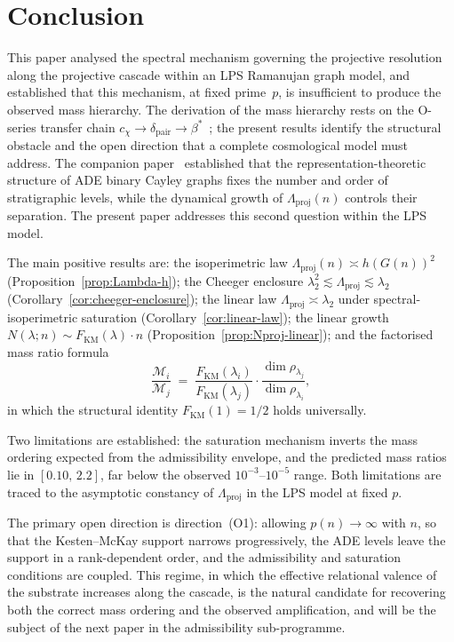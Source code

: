 \section{Conclusion}
  \label{sec:conclusion}

  This paper analysed the spectral mechanism governing the projective resolution
  along the projective cascade within an LPS Ramanujan graph model, and established
  that this mechanism, at fixed prime~$p$, is insufficient to produce the observed
  mass hierarchy.
  The derivation of the mass hierarchy rests on the O-series transfer chain
  $c_\chi \to \delta_{\mathrm{pair}} \to \beta^*$~\cite{Beau2026a28,Beau2026a29};
  the present results identify the structural obstacle and the open direction that a
  complete cosmological model must address.
  The companion paper~\cite{Beau2026a4} established that the
  representation-theoretic structure of ADE binary Cayley graphs fixes the
  number and order of stratigraphic levels, while the dynamical growth of
  $\Lambda_{\mathrm{proj}}(n)$ controls their separation.
  The present paper addresses this second question within the LPS model.

  The main positive results are: the isoperimetric law
  $\Lambda_{\mathrm{proj}}(n) \asymp h(G(n))^2$
  (Proposition~\ref{prop:Lambda-h}); the Cheeger enclosure
  $\lambda_2^2 \lesssim \Lambda_{\mathrm{proj}} \lesssim \lambda_2$
  (Corollary~\ref{cor:cheeger-enclosure}); the linear law
  $\Lambda_{\mathrm{proj}} \asymp \lambda_2$ under spectral-isoperimetric
  saturation (Corollary~\ref{cor:linear-law}); the linear growth
  $N(\lambda; n) \sim F_{\mathrm{KM}}(\lambda) \cdot n$
  (Proposition~\ref{prop:Nproj-linear}); and the factorised mass ratio formula
  \[
    \frac{\mathcal{M}_i}{\mathcal{M}_j}
    \;=\;
    \frac{F_{\mathrm{KM}}(\lambda_i)}{F_{\mathrm{KM}}(\lambda_j)}
    \cdot
    \frac{\dim\rho_{\lambda_j}}{\dim\rho_{\lambda_i}},
  \]
  in which the structural identity $F_{\mathrm{KM}}(1) = 1/2$ holds universally.

  Two limitations are established: the saturation mechanism inverts the mass
  ordering expected from the admissibility envelope, and the predicted mass
  ratios lie in $[0.10,\, 2.2]$, far below the observed $10^{-3}$--$10^{-5}$
  range.
  Both limitations are traced to the asymptotic constancy of
  $\Lambda_{\mathrm{proj}}$ in the LPS model at fixed $p$.

  The primary open direction is direction~(O1): allowing $p(n) \to \infty$ with
  $n$, so that the Kesten--McKay support narrows progressively, the ADE levels
  leave the support in a rank-dependent order, and the admissibility and
  saturation conditions are coupled.
  This regime, in which the effective relational valence of the substrate
  increases along the cascade, is the natural candidate for recovering both the
  correct mass ordering and the observed amplification, and will be the subject
  of the next paper in the admissibility sub-programme.

